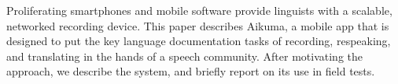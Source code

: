 Proliferating smartphones and mobile software provide linguists with a scalable, networked recording device. This paper describes Aikuma, a mobile app that is designed to put the key language documentation tasks of recording, respeaking, and translating in the hands of a speech community. After motivating the approach, we describe the system, and briefly report on its use in field tests.

